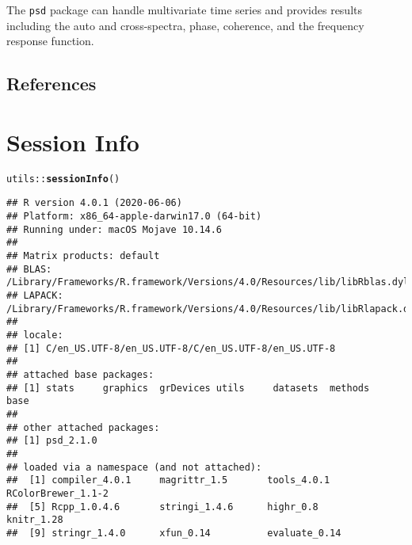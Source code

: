 \documentclass[11pt]{article}\usepackage[]{graphicx}\usepackage[]{color}
\makeatletter
\newcommand{\hlopt}[1]{\textcolor[rgb]{0,0,0}{#1}}%
\newcommand{\hlstd}[1]{\textcolor[rgb]{0.345,0.345,0.345}{#1}}%
\newcommand{\hlkwd}[1]{\textcolor[rgb]{0.737,0.353,0.396}{\textbf{#1}}}%
\newenvironment{kframe}{%
 \def\at@end@of@kframe{}%
 \ifinner\ifhmode%
  \def\at@end@of@kframe{\end{minipage}}%
  \begin{minipage}{\columnwidth}%
 \fi\fi%
 \def\FrameCommand##1{\hskip\@totalleftmargin \hskip-\fboxsep
 \colorbox{shadecolor}{##1}\hskip-\fboxsep
     \hskip-\linewidth \hskip-\@totalleftmargin \hskip\columnwidth}%
 \MakeFramed {\advance\hsize-\width
   \@totalleftmargin\z@ \linewidth\hsize
   \@setminipage}}%
 {\par\unskip\endMakeFramed%
 \at@end@of@kframe}
\newenvironment{knitrout}{}{} %
\newcommand{\Rcmd}[1]{\texttt{#1}}
\makeatother
\begin{document}
The \Rcmd{psd} package can handle multivariate time series and provides results including the auto and cross-spectra, phase, coherence, and the frequency response function.  


\subsection{References}


\section*{Session Info}
\begin{knitrout}
\color{fgcolor}\begin{kframe}
\begin{alltt}
\hlstd{utils}\hlopt{::}\hlkwd{sessionInfo}\hlstd{()}
\end{alltt}
\begin{verbatim}
## R version 4.0.1 (2020-06-06)
## Platform: x86_64-apple-darwin17.0 (64-bit)
## Running under: macOS Mojave 10.14.6
## 
## Matrix products: default
## BLAS:   /Library/Frameworks/R.framework/Versions/4.0/Resources/lib/libRblas.dylib
## LAPACK: /Library/Frameworks/R.framework/Versions/4.0/Resources/lib/libRlapack.dylib
## 
## locale:
## [1] C/en_US.UTF-8/en_US.UTF-8/C/en_US.UTF-8/en_US.UTF-8
## 
## attached base packages:
## [1] stats     graphics  grDevices utils     datasets  methods   base     
## 
## other attached packages:
## [1] psd_2.1.0
## 
## loaded via a namespace (and not attached):
##  [1] compiler_4.0.1     magrittr_1.5       tools_4.0.1        RColorBrewer_1.1-2
##  [5] Rcpp_1.0.4.6       stringi_1.4.6      highr_0.8          knitr_1.28        
##  [9] stringr_1.4.0      xfun_0.14          evaluate_0.14
\end{verbatim}
\end{kframe}
\end{knitrout}



\end{document}
